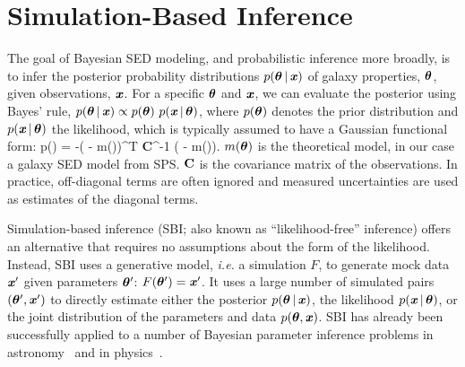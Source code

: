 \section{Simulation-Based Inference} \label{sec:sbi}
The goal of Bayesian SED modeling, and probabilistic inference more
broadly, is to infer the posterior probability distributions
$p(\boldsymbol{\theta}\,|\,\textbf{\textit{x}})$ of galaxy properties, $\boldsymbol{\theta}$, given observations, 
$\textbf{\textit{x}}$.
For a specific $\boldsymbol{\theta}$ and $\textbf{\textit{x}}$, we can evaluate the posterior using
Bayes' rule, 
$p(\boldsymbol{\theta}\,|\,\textbf{\textit{x}}) \propto p(\boldsymbol{\theta})~p(\textbf{\textit{x}}\,|\,\boldsymbol{\theta})$, where 
$p(\boldsymbol{\theta})$ denotes the prior distribution and $p(\textbf{\textit{x}}\,|\,\boldsymbol{\theta})$ the
likelihood, which is typically assumed to have a Gaussian functional form: 
\beq
\label{eq:likelihood}
    \ln p(\given\btheta) = -\left( - m(\btheta)\right)^T {\bf C}^{-1}
    \left( - m(\btheta)\right).
\eeq
$m(\boldsymbol{\theta})$ is the theoretical model, in our case a galaxy SED model from SPS.
${\bf C}$ is the covariance matrix of the observations. 
In practice, off-diagonal terms are often ignored and measured uncertainties
are used as estimates of the diagonal terms. 

Simulation-based inference (SBI; also known as ``likelihood-free'' inference)
offers an alternative that requires no assumptions about the form of the
likelihood. 
Instead, SBI uses a generative model, \emph{i.e.} a simulation $F$, to generate
mock data $\textbf{\textit{x}}'$ given parameters $\boldsymbol{\theta}'$: $F(\boldsymbol{\theta}') = \textbf{\textit{x}}'$. 
It uses a large number of simulated pairs $(\boldsymbol{\theta}', \textbf{\textit{x}}')$ to directly estimate
either the posterior  $p(\boldsymbol{\theta}\,|\, \textbf{\textit{x}})$, the likelihood
$p(\textbf{\textit{x}}\,|\, \boldsymbol{\theta})$, or the joint distribution of the parameters and data $p(\boldsymbol{\theta}, \textbf{\textit{x}})$. 
SBI has already been successfully applied to a number of Bayesian parameter
inference problems in astronomy~\citep[\emph{e.g.}][]{cameron2012, weyant2013,
hahn2017b, kacprzak2018, alsing2018, wong2020, huppenkothen2021, zhang2021}
and in physics~\citep[\emph{e.g.}][]{brehmer2019, cranmer2020}.



